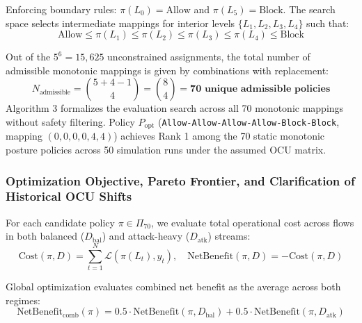 \documentclass[journal,10pt,onecolumn]{IEEEtran}
\begin{document}
Enforcing boundary rules: $\pi(L_0) = \text{Allow}$ and $\pi(L_5) = \text{Block}$. The search space selects intermediate mappings for interior levels $\{L_1, L_2, L_3, L_4\}$ such that:
$$\text{Allow} \le \pi(L_1) \le \pi(L_2) \le \pi(L_3) \le \pi(L_4) \le \text{Block}$$

Out of the $5^6 = 15,625$ unconstrained assignments, the total number of admissible monotonic mappings is given by combinations with replacement:
$$N_{\text{admissible}} = \binom{5 + 4 - 1}{4} = \binom{8}{4} = \mathbf{70 \text{ unique admissible policies}}$$
Algorithm 3 formalizes the evaluation search across all 70 monotonic mappings without safety filtering. Policy $P_{\text{opt}}$ (\texttt{Allow-Allow-Allow-Allow-Block-Block}, mapping $(0,0,0,0,4,4)$) achieves Rank 1 among the 70 static monotonic posture policies across 50 simulation runs under the assumed OCU matrix.

\subsubsection{Optimization Objective, Pareto Frontier, and Clarification of Historical OCU Shifts}
For each candidate policy $\pi \in \Pi_{70}$, we evaluate total operational cost across flows in both balanced ($D_{\text{bal}}$) and attack-heavy ($D_{\text{atk}}$) streams:
$$\text{Cost}(\pi, D) = \sum_{t=1}^N \mathcal{L}(\pi(L_t), y_t), \quad \text{NetBenefit}(\pi, D) = -\text{Cost}(\pi, D)$$

Global optimization evaluates combined net benefit as the average across both regimes:
$$\text{NetBenefit}_{\text{comb}}(\pi) = 0.5 \cdot \text{NetBenefit}(\pi, D_{\text{bal}}) + 0.5 \cdot \text{NetBenefit}(\pi, D_{\text{atk}})$$
\end{document}
